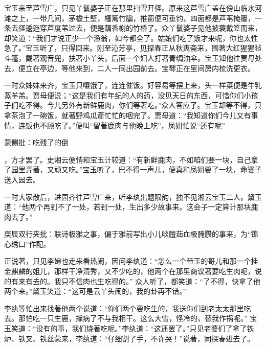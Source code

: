 \begin{parag}
    宝玉来至芦雪广，只见丫鬟婆子正在那里扫雪开径。原来这芦雪广盖在傍山临水河滩之上，一带几间，茅檐土壁，槿篱竹牖，推窗便可垂钓，四面都是芦苇掩覆，一条去径逶迤穿芦度苇过去，便是藕香榭的竹桥了。众丫鬟婆子见他披蓑戴笠而来，却笑道：“我们才说正少一个渔翁，如今都全了。姑娘们吃了饭才来呢，你也太性急了。”宝玉听了，只得回来。刚至沁芳亭，见探春正从秋爽斋来，围著大红猩猩毡斗篷，戴著观音兜，扶著小丫头，后面一个妇人打著青绸油伞。宝玉知他往贾母处去，便立在亭边，等他来到，二人一同出园前去。宝琴正在里间房内梳洗更衣。
\end{parag}


\begin{parag}
    一时众姊妹来齐，宝玉只嚷饿了，连连催饭。好容易等摆上来，头一样菜便是牛乳蒸羊羔。贾母便说；“这是我们有年纪的人的药，没见天日的东西，可惜你们小孩子们吃不得。今儿另外有新鲜鹿肉，你们等著吃。”众人答应了。宝玉却等不得，只拿茶泡了一碗饭，就著野鸡瓜齑忙忙的咽完了。贾母道：“我知道你们今儿又有事情，连饭也不顾吃了。”便叫“留著鹿肉与他晚上吃”，凤姐忙说“还有呢”\begin{note}蒙侧批：吃残了的倒\end{note}，方才罢了。史湘云便悄和宝玉计较道：“有新鲜鹿肉，不如咱们要一块，自己拿了园里弄著，又顽又吃。”宝玉听了，巴不得一声儿，便真和凤姐要了一块，命婆子送入园去。
\end{parag}


\begin{parag}
    一时大家散后，进园齐往芦雪广来，听李纨出题限韵，独不见湘云宝玉二人。黛玉道：“他两个再到不了一处，若到一处，生出多少故事来。这会子一定算计那块鹿肉去了。”\begin{note}庚辰双行夹批：联诗极雅之事，偏于雅前写出小儿啖膻茹血极腌臜的事来，为“锦心绣口”作配。\end{note}正说著，只见李婶也走来看热闹，因问李纨道：“怎么一个带玉的哥儿和那一个挂金麒麟的姐儿，那样干净清秀，又不少吃的，他两个在那里商议著要吃生肉呢，说的有来有去的。我只不信肉也生吃得的。” 众人听了，都笑道：“了不得，快拿了他两个来。”黛玉笑道：“这可是云丫头闹的，我的卦再不错。”
\end{parag}


\begin{parag}
    李纨等忙出来找著他两个说道：“你们两个要吃生的，我送你们到老太太那里吃去。那怕吃一只生鹿，撑病了不与我相干。这么大雪，怪冷的，替我作祸呢。” 宝玉笑道：“没有的事，我们烧著吃呢。”李纨道：“这还罢了。”只见老婆们了拿了铁炉、铁叉、铁丝蒙来，李纨道：“仔细割了手，不许哭！”说著，同探春进去了。
\end{parag}


